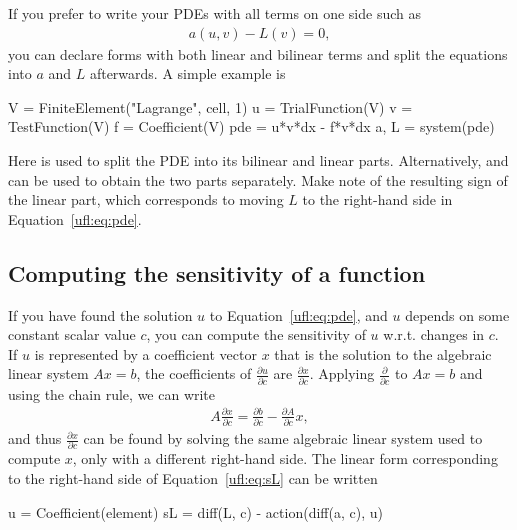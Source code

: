 If you prefer to write your PDEs with all terms on one side such as
\begin{align}\label{ufl:eq:pde}
a(u, v) - L(v) = 0,
\end{align}
you can declare forms with both linear and bilinear terms and split the
equations into $a$ and $L$ afterwards.  A simple example is
\begin{uflcode}
V = FiniteElement("Lagrange", cell, 1)
u = TrialFunction(V)
v = TestFunction(V)
f = Coefficient(V)
pde = u*v*dx - f*v*dx
a, L = system(pde)
\end{uflcode}
Here  is used to split the PDE into its bilinear and
linear parts. Alternatively,  and  can be used to
obtain the two parts separately. Make note of the resulting sign of the
linear part, which corresponds to moving $L$ to the right-hand side in
Equation~\eqref{ufl:eq:pde}.

\subsection{Computing the sensitivity of a function} \label{ufl:sec:sensitivity}

If you have found the solution $u$ to Equation~\eqref{ufl:eq:pde},
and $u$ depends on some constant scalar value $c$, you can compute the
sensitivity of $u$ w.r.t. changes in $c$.  If $u$ is represented by
a coefficient vector $x$ that is the solution to the algebraic linear
system $A x = b$, the coefficients of $\frac{\partial u}{\partial c}$
are $\frac{\partial x}{\partial c}$.  Applying $\frac{\partial}{\partial
c}$ to $A x = b$ and using the chain rule, we can write
\begin{align}\label{ufl:eq:sL}
A \frac{\partial x}{\partial c} = \frac{\partial b}{\partial c} - \frac{\partial A}{\partial c} x,
\end{align}
and thus $\frac{\partial x}{\partial c}$ can be found by solving the
same algebraic linear system used to compute $x$, only with a different
right-hand side.  The linear form corresponding to the right-hand side
of Equation~\eqref{ufl:eq:sL} can be written
\begin{uflcode}
u = Coefficient(element)
sL = diff(L, c) - action(diff(a, c), u)
\end{uflcode}

\pagebreak

